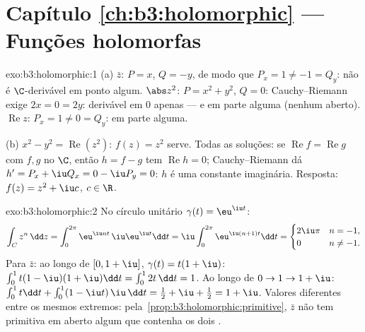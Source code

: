 \section*{Capítulo \ref{ch:b3:holomorphic} --- Funções
holomorfas}

\begin{solution}{exo:b3:holomorphic:1}
(a) $\bar z$: $P = x$, $Q = -y$, de modo que $P_x = 1 \neq -1 = Q_y$:
não é $\C$-derivável em ponto algum. $\abs z^2$: $P = x^2 + y^2$, $Q =
0$: Cauchy--Riemann exige $2x = 0 = 2y$: derivável em
$0$ apenas --- e  em parte alguma (nenhum aberto).
$\operatorname{Re}z$: $P_x = 1 \neq 0 = Q_y$: em parte alguma.

(b) $x^2 - y^2 = \operatorname{Re}(z^2)$: $f(z) = z^2$ serve.
Todas as soluções: se $\operatorname{Re}f = \operatorname{Re}g$
com $f, g$  no  $\C$, então $h = f -
g$ tem $\operatorname{Re}h = 0$; Cauchy--Riemann dá $h' =
P_x + \iu Q_x = 0 - \iu P_y = 0$: $h$ é uma constante
imaginária. Resposta: $f(z) = z^2 + \iu c$, $c \in \R$.
\end{solution}

\begin{solution}{exo:b3:holomorphic:2}
No círculo unitário $\gamma(t) = \eu^{\iu t}$:
\[
\int_C z^n\,\dd z = \int_0^{2\pi}\eu^{\iu nt}\,\iu\eu^{\iu
t}\dd t = \iu\int_0^{2\pi}\eu^{\iu(n+1)t}\dd t
= \begin{cases} 2\iu\pi & n = -1,\\ 0 & n \neq -1.\end{cases}
\]
Para $\bar z$: ao longo de $[0, 1+\iu]$, $\gamma(t) = t(1 + \iu)$:
$\int_0^1 t(1 - \iu)(1 + \iu)\dd t = \int_0^12t\,\dd t = 1$.
Ao longo de $0 \to 1 \to 1 + \iu$: $\int_0^1t\dd t +
\int_0^1(1 - \iu t)\,\iu\,\dd t = \frac12 + \iu + \frac12 = 1
+ \iu$. Valores diferentes entre os mesmos extremos: pela~\cref{prop:b3:holomorphic:primitive}, $\bar z$ não tem
primitiva em aberto algum que contenha os dois .
\end{solution}


